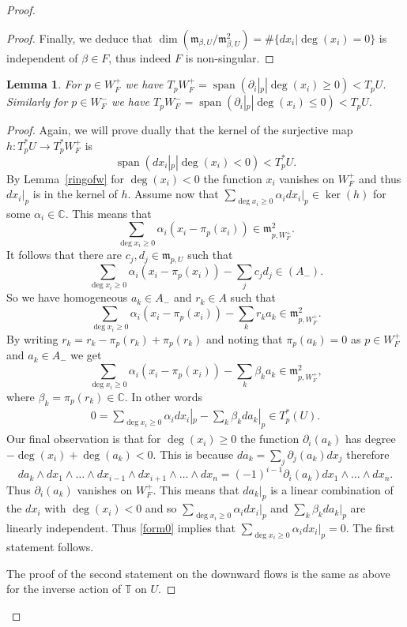 \documentclass[12pt]{article}
\numberwithin{equation}{section}
\newtheorem{lemma}[theorem]{Lemma}
\theoremstyle{remark}
\theoremstyle{definition}
\numberwithin{theorem}{section}
\def\beq{\begin{eqnarray}}
\def\eeq{\end{eqnarray}}
\def\C{\mathbb{C}}
\newcommand{\T}{{\mathbb{T}}}
\def\m{{\mathfrak m}}
\renewcommand{\1}{\mathbbm{1}}
\begin{document}
\begin{proof}
\begin{proof}
		Finally, we deduce that $\dim(\m_{\beta,U}/\m^2_{\beta,U})=\#\{dx_i|\deg(x_i)=0\}$ is independent of $\beta\in F$, thus indeed $F$ is non-singular.
	\end{proof}
	\begin{lemma} \label{tangentattractor} For $p\in W^+_{F}$ we have $T_p W^+_{F}=\operatorname{span}(\partial_i|_p|\deg(x_i)\geq 0)<T_pU.$ Similarly for $p\in W^-_{F}$ we have $T_p W^-_{F}=\operatorname{span}(\partial_i|_p|\deg(x_i)\leq 0)<T_pU.$
	\end{lemma}
	\begin{proof} Again, we will prove dually that the kernel of the surjective map $h:T^*_p U\to T^*_p W^+_{F}$ is $$\operatorname{span}(dx_i|_p| \deg(x_i)< 0)<T^*_p U.$$ By Lemma~\ref{ringofw} for $\deg(x_i)<0$ the function $x_i$ vanishes on $W^+_{F}$ and thus $dx_i|_p$ is in the kernel of $h$. 
		Assume now that $\sum_{\deg x_i\geq 0} \alpha_i dx_i|_p\in \ker(h)$ for some $\alpha_i\in \C$.  This means that $$\sum_{\deg x_i\geq 0} \alpha_i (x_i-\pi_p(x_i))\in \m_{p,W^+_{F}}^2.$$ It follows that there are $c_j,d_j\in \m_{p,U}$ such that $$\sum_{\deg x_i\geq 0} \alpha_i (x_i-\pi_p(x_i))-\sum_j c_j d_j\in (A_-).$$ So we have homogeneous $a_k\in A_-$ and $r_k\in A$ such that $$\sum_{\deg x_i\geq 0} \alpha_i (x_i-\pi_p(x_i))-\sum_k r_k a_k\in \m_{p,W^+_{F}}^2 .$$ By writing $r_k=r_k-\pi_p(r_k)+\pi_p(r_k)$ and noting that $\pi_p(a_k)=0$ as $p\in W^+_{F}$ and $a_k\in A_-$ we get
		$$\sum_{\deg x_i\geq 0} \alpha_i (x_i-\pi_p(x_i))-\sum_k \beta_k a_k\in \m_{p,W^+_{F}}^2 ,$$ where $\beta_k=\pi_p(r_k)\in \C$. In other words \beq \label{form0} 0=\sum_{\deg x_i\geq 0} \alpha_i dx_i|_p-\sum_k \beta_k da_k|_p \in T^*_p(U).\eeq Our final observation is that for $\deg(x_i)\geq 0$ the function $\partial_i(a_k)$ has degree $-\deg(x_i)+\deg(a_k)<0$. This is because $da_k=  \sum_j \partial_j(a_k)dx_j$ therefore $$ da_k\wedge dx_1\wedge\dots \wedge dx_{i-1}\wedge d x_{i+1}\wedge \dots \wedge dx_n=(-1)^{i-1} \partial_i(a_k)dx_1\wedge \dots \wedge dx_n. $$ Thus $\partial_i(a_k)$ vanishes on $W^+_{F}$. This means that $da_k|_p$ is a linear combination of the $dx_i$ with $\deg(x_i)<0$ and so $\sum_{\deg x_i\geq 0} \alpha_i dx_i|_p$ and $\sum_k \beta_k da_k|_p$ are linearly independent. Thus \eqref{form0} implies that $\sum_{\deg x_i\geq 0} \alpha_i dx_i|_p=0$. The first statement follows. 
		
		The proof of the second statement on the downward flows is  the same as above for the inverse action of $\T$ on $U$.   \end{proof}
	

\end{proof}
\end{document}
